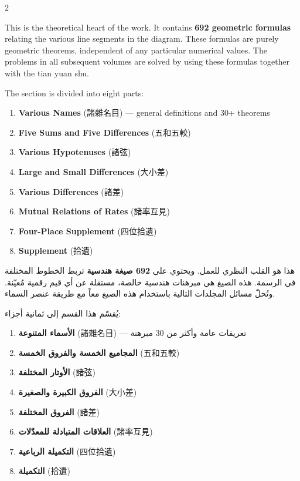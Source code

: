 \documentclass[11pt,a4paper]{article}
\newcommand{\ar}[1]{\arabicfont\beginR #1\endR}
\begin{document}
\begin{paracol}{2}

This is the theoretical heart of the work. It contains \textbf{692 geometric formulas} relating the various line segments in the diagram. These formulas are purely geometric theorems, independent of any particular numerical values. The problems in all subsequent volumes are solved by using these formulas together with the tian yuan shu.

The section is divided into eight parts:

\begin{enumerate}[leftmargin=2em]
  \item \textbf{Various Names} (諸雜名目) --- general definitions and 30+ theorems
  \item \textbf{Five Sums and Five Differences} (五和五較)
  \item \textbf{Various Hypotenuses} (諸弦)
  \item \textbf{Large and Small Differences} (大小差)
  \item \textbf{Various Differences} (諸差)
  \item \textbf{Mutual Relations of Rates} (諸率互見)
  \item \textbf{Four-Place Supplement} (四位拾遺)
  \item \textbf{Supplement} (拾遺)
\end{enumerate}

\switchcolumn

\ar{هذا هو القلب النظري للعمل. ويحتوي على \textbf{692 صيغة هندسية} تربط الخطوط المختلفة في الرسمة. هذه الصيغ هي مبرهنات هندسية خالصة، مستقلة عن أي قيم رقمية مُعيّنة. وتُحلّ مسائل المجلدات التالية باستخدام هذه الصيغ معاً مع طريقة عنصر السماء.}

\vspace{0.3cm}

\ar{يُقسّم هذا القسم إلى ثمانية أجزاء:}

\begin{enumerate}[leftmargin=2em,rightmargin=0em]
  \item \ar{\textbf{الأسماء المتنوعة} (諸雜名目) — تعريفات عامة وأكثر من 30 مبرهنة}
  \item \ar{\textbf{المجاميع الخمسة والفروق الخمسة} (五和五較)}
  \item \ar{\textbf{الأوتار المختلفة} (諸弦)}
  \item \ar{\textbf{الفروق الكبيرة والصغيرة} (大小差)}
  \item \ar{\textbf{الفروق المختلفة} (諸差)}
  \item \ar{\textbf{العلاقات المتبادلة للمعدّلات} (諸率互見)}
  \item \ar{\textbf{التكميلة الرباعية} (四位拾遺)}
  \item \ar{\textbf{التكميلة} (拾遺)}
\end{enumerate}

\end{paracol}
\end{document}
